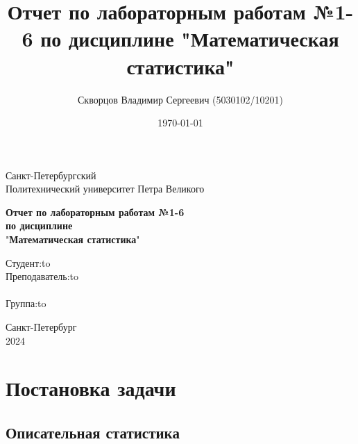 \documentclass[12pt,a4paper]{article}
\title{Отчет по лабораторным работам №1-6 по дисциплине
	"Математическая статистика"}
\author{Скворцов Владимир Сергеевич (5030102/10201)}
\date{\today}
\begin{document}
	\begin{titlepage}

		\Large

		\begin{center}
			Санкт-Петербургский \\ Политехнический университет Петра Великого

			\vspace{10em}

			\textbf{Отчет по лабораторным работам №1-6} \\
			\textbf{по дисциплине}\\
			"\textbf{Математическая статистика}"

			\vspace{2em}

		\end{center}

		\vspace{6em}

		\newbox{\lbox}
		\newlength{\maxl}
		\setlength{\maxl}{\wd\lbox}
		\hfill\parbox{12cm}{
			\hspace*{3cm}\hspace*{-5cm}Студент:\hfill\hbox to\\
			\hspace*{3cm}\hspace*{-5cm}Преподаватель:\hfill\hbox to\\
			\\
			\hspace*{3cm}\hspace*{-5cm}Группа:\hfill\hbox to\\
		}

		\vspace{\fill}

		\begin{center}
			Санкт-Петербург \\ 2024
		\end{center}

	\end{titlepage}

	\tableofcontents\newpage

	\section{Постановка задачи}

	\subsection{Описательная статистика}
\end{document}
